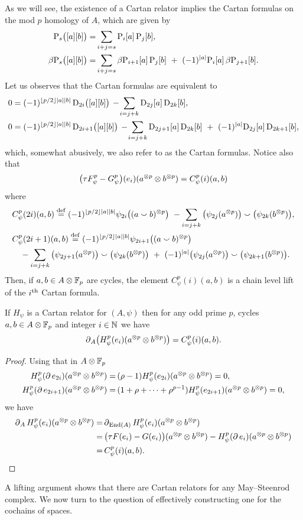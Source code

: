 As we will see, the existence of a Cartan relator implies the Cartan formulas on the mod $p$ homology of $A$, which are given by
\begin{align*}
	\mathrm{P}_s\big([a][b]\big) =&
	\sum_{i+j=s} \mathrm{P}_i[a] \, \mathrm{P}_j[b], \\
	\beta\mathrm{P}_s\big([a][b]\big) =&
	\sum_{i+j=s} \beta\mathrm{P}_{i+1}[a] \, \mathrm{P}_j[b] \ +\ (-1)^{\lvert a\rvert} \mathrm{P}_i[a] \, \beta\mathrm{P}_{j+1}[b].
\end{align*}
Let us observes that the Cartan formulas are equivalent to
\begin{align*}
	0 &= (-1)^{\floor{p/2}\bars{a}\bars{b}} \, \rD_{2i}\big([a][b]\big) \,-\!
	\sum_{i=j+k} \rD_{2j}[a] \, \rD_{2k}[b], \\
	0 &= (-1)^{\floor{p/2}\bars{a}\bars{b}} \, \rD_{2i+1}\big([a][b]\big) \,-\!
	\sum_{i=j+k} \rD_{2j+1}[a] \, \rD_{2k}[b] \ +\ (-1)^{\bars{a}}\rD_{2j}[a] \, \rD_{2k+1}[b],
\end{align*}
which, somewhat abusively, we also refer to as the Cartan formulas.
Notice also that
\[
\big(\tau F_\psi^p - G_\psi^p\big)(e_i)(a^{\otimes p} \otimes b^{\otimes p}) = C^p_\psi(i)(a,b)
\]
where
\begin{align*}
	&C_\psi^p(2i)(a,b) \stackrel{\mathrm{def}}{=} (-1)^{\lfloor p/2\rfloor\lvert a\rvert\lvert b\rvert} \psi_{2i}\big((a \smallsmile b)^{\otimes p}\big) \ -
	\sum_{i=j+k}\big(\psi_{2j}(a^{\otimes p})\big) \smallsmile \big(\psi_{2k}(b^{\otimes p})\big), \\
	&C_\psi^p(2i+1)(a,b) \stackrel{\mathrm{def}}{=} (-1)^{\lfloor p/2\rfloor\lvert a\rvert\lvert b\rvert} \psi_{2i+1}\big((a \smallsmile b)^{\otimes p}\big) \\
	&\quad -\sum_{i=j+k} \big(\psi_{2j+1}(a^{\otimes p})\big) \smallsmile \big(\psi_{2k}(b^{\otimes p})\big)\ +\
	(-1)^{\lvert a\rvert}\big(\psi_{2j}(a^{\otimes p})\big) \smallsmile \big(\psi_{2k+1}(b^{\otimes p})\big).
\end{align*}
Then, if $a,b \in A \otimes {\mathbb{F}_p}$ are cycles, the element $C_\psi^p(i)(a,b)$ is a chain level lift of the $i^{\mathrm{th}}$ Cartan formula.

\begin{theorem}
	If $H_\psi$ is a Cartan relator for $(A, \psi)$ then for any odd prime $p$, cycles $a,b \in A \otimes {\mathbb{F}_p}$ and integer $i \in \mathbb{N}$ we have
	\[
	\operatorname{\partial}_A\!\big(H_\psi^p(e_i)(a^{\otimes p} \otimes b^{\otimes p})\big) = C_\psi^p(i)(a, b).
	\]
\end{theorem}

\begin{proof}
	Using that in $A \otimes {\mathbb{F}_p}$
	\begin{align*}
		H_\psi^p(\operatorname{\partial} e_{2i})(a^{\otimes p} \otimes b^{\otimes p}) =&\,
		(\rho - 1) H_\psi^p(e_{2i})(a^{\otimes p} \otimes b^{\otimes p}) = 0, \\
		H_\psi^p(\operatorname{\partial} e_{2i+1})(a^{\otimes p} \otimes b^{\otimes p}) =&\,
		(1+\rho+\dots+\rho^{p-1}) H_\psi^p(e_{2i+1})(a^{\otimes p} \otimes b^{\otimes p}) = 0,
	\end{align*}
	we have
	\begin{align*}
		\operatorname{\partial}_A H_\psi^p(e_i)(a^{\otimes p} \otimes b^{\otimes p}) =&
		\operatorname{\partial}_{\mathrm{End}(A)} H_\psi^p(e_i)(a^{\otimes p} \otimes b^{\otimes p}) \\ =& \,
		\big(\tau F(e_i) - G(e_i)\big)(a^{\otimes p} \otimes b^{\otimes p}) -
		H_\psi^p(\operatorname{\partial} e_i)(a^{\otimes p} \otimes b^{\otimes p}) \\ =&\,
		C^p_\psi(i)(a,b).\qedhere
	\end{align*}
\end{proof}

A lifting argument shows that there are Cartan relators for any May--Steenrod complex.
We now turn to the question of effectively constructing one for the cochains of spaces.